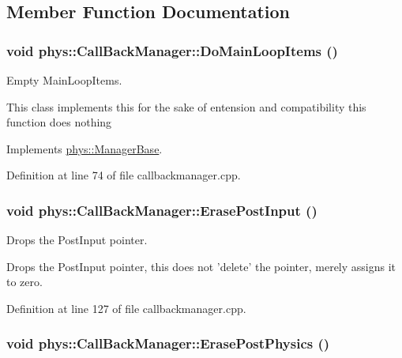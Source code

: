 \subsection{Member Function Documentation}
\hypertarget{classphys_1_1CallBackManager_acaa942de1f6f8b42d06d981121d501e0}{
\subsubsection[{DoMainLoopItems}]{\setlength{\rightskip}{0pt plus 5cm}void phys::CallBackManager::DoMainLoopItems ()}}
\label{d1/d47/classphys_1_1CallBackManager_acaa942de1f6f8b42d06d981121d501e0}


Empty MainLoopItems. 

This class implements this for the sake of entension and compatibility this function does nothing 

Implements \hyperlink{classphys_1_1ManagerBase_aa9e13a3f7c398b708f0f242610b5abf7}{phys::ManagerBase}.



Definition at line 74 of file callbackmanager.cpp.

\hypertarget{classphys_1_1CallBackManager_a84ccf382be58b42439869ec9b77a0f89}{
\subsubsection[{ErasePostInput}]{\setlength{\rightskip}{0pt plus 5cm}void phys::CallBackManager::ErasePostInput ()}}
\label{d1/d47/classphys_1_1CallBackManager_a84ccf382be58b42439869ec9b77a0f89}


Drops the PostInput pointer. 

Drops the PostInput pointer, this does not 'delete' the pointer, merely assigns it to zero. 

Definition at line 127 of file callbackmanager.cpp.

\hypertarget{classphys_1_1CallBackManager_a2d03573a93606e9d3fcd7adad5c8c397}{
\subsubsection[{ErasePostPhysics}]{\setlength{\rightskip}{0pt plus 5cm}void phys::CallBackManager::ErasePostPhysics ()}}
\label{d1/d47/classphys_1_1CallBackManager_a2d03573a93606e9d3fcd7adad5c8c397}


